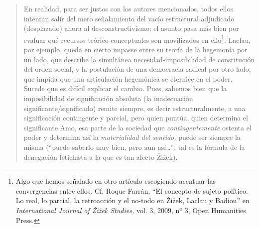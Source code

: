 \begin{quote}
En realidad, para ser justos con los autores mencionados, todos ellos intentan salir del mero señalamiento del vacío estructural adjudicado (desplazado) ahora al desconstructivismo; el asunto pasa más bien por evaluar qué recursos teórico-conceptuales son movilizados en ello\footnote{Algo que hemos señalado en otro artículo escogiendo acentuar las convergencias entre ellos. Cf. Roque Farrán, \enquote{El concepto de sujeto político. Lo real, lo parcial, la retroacción y el no-todo en Žižek, Laclau y Badiou} en \emph{International Journal of Žižek Studies,} vol. 3, 2009, nº 3, Open Humanities Press.}. Laclau, por ejemplo, queda en cierto impasse entre su teoría de la hegemonía por un lado, que describe la simultánea necesidad-imposibilidad de constitución del orden social, y la postulación de una democracia radical por otro lado, que impida que una articulación hegemónica se eternice en el poder. Sucede que es difícil explicar el cambio. Pues, sabemos bien que la imposibilidad de significación absoluta (la inadecuación significante/significado) remite siempre, es decir estructuralmente, a una significación contingente y parcial, pero quien puntúa, quien determina el significante Amo, esa parte de la sociedad que \emph{contingentemente} ostenta el poder y determina así la \emph{materialidad del sentido,} puede ser siempre la misma (\enquote{puede saberlo muy bien, pero aun así\ldots}, tal es la fórmula de la denegación fetichista a la que es tan afecto Žižek).


\end{quote}
